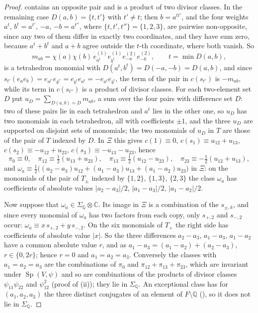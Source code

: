 \documentclass[11pt,reqno]{amsart}
\theoremstyle{plain}
\theoremstyle{definition}
\theoremstyle{remark}
\newcommand{\QQ}{\mathbb{Q}}
\newcommand{\CC}{\mathbb{C}}
\DeclareMathOperator{\Sp}{Sp}
\begin{document}
\begin{proof}
contains an opposite pair and is a product of two divisor classes. In the
remaining case $D(a,b)=\{t,t'\}$ with $t'\ne t$; then $b=a^{tt'}$, and the
four weights $a^{t}$, $b^{t}=a^{t'}$, $-a$, $-b=a^{t''}$, where
$\{t,t',t''\}=\{1,2,3\}$, are pairwise non-opposite, since any two of them
differ in exactly two coordinates, and they have sum zero, because
$a^{t}+b^{t}$ and $a+b$ agree outside the $t$-th coordinate, where both
vanish. So
\[
  m_{ab}=\chi(a)\chi(b)\,e^{(1)}_{a^{t}}e^{(1)}_{b^{t}}e^{(2)}_{-a}e^{(2)}_{-b},
  \qquad t=\min D(a,b),
\]
is a tetrahedron monomial with $D(a^{t},b^{t})=D(-a,-b)=D(a,b)$, and since
$s_{t'}(e_{a}e_{b})=e_{a^{t'}}e_{b^{t'}}=e_{b^{t}}e_{a^{t}}=-e_{a^{t}}e_{b^{t}}$,
the term of the pair in $c(s_{t'})$ is $-m_{ab}$, while its term in
$c(s_{t''})$ is a product of divisor classes. For each two-element set $D$
put $u_{D}=\sum_{D(a,b)=D}m_{ab}$, a sum over the four pairs with difference
set $D$: two of these pairs lie in each tetrahedron and $a^{t}$ lies in the
other one, so $u_{D}$ has two monomials in each tetrahedron, all with
coefficients $\pm1$, and the three $u_{D}$ are supported on disjoint sets of
monomials; the two monomials of $u_{D}$ in $T$ are those of the pair of
$T$ indexed by $D$. In $\Xi$ this gives $c(1)\equiv0$,
$c(s_{1})\equiv u_{12}+u_{13}$, $c(s_{2})\equiv-u_{12}+u_{23}$,
$c(s_{3})\equiv-u_{13}-u_{23}$, hence
\begin{equation}\label{eq:pimodulo}
  \pi_{0}\equiv0,\quad
  \pi_{12}\equiv\tfrac12(u_{13}+u_{23}),\quad
  \pi_{13}\equiv\tfrac12(u_{12}-u_{23}),\quad
  \pi_{23}\equiv-\tfrac12(u_{12}+u_{13}),
\end{equation}
and $\omega_{a}\equiv\frac12\bigl((a_{2}-a_{3})u_{12}+(a_{1}-a_{3})u_{13}
+(a_{1}-a_{2})u_{23}\bigr)$ in $\Xi$: on the monomials of the pair of
$T_{\pm}$ indexed by $\{1,2\}$, $\{1,3\}$, $\{2,3\}$ the class $\omega_{a}$
has coefficients of absolute values $|a_{2}-a_{3}|/2$, $|a_{1}-a_{3}|/2$,
$|a_{1}-a_{2}|/2$.

Now suppose that $\omega_{a}\in\Sigma_{\QQ}\otimes\CC$. Its image in $\Xi$
is a combination of the $s_{\pm,k}$, and since every monomial of
$\omega_{a}$ has two factors from each copy, only $s_{+,2}$ and $s_{-,2}$
occur: $\omega_{a}\equiv x\,s_{+,2}+y\,s_{-,2}$. On the six monomials of
$T_{+}$ the right side has coefficients of absolute value $|x|$. So the
three differences $a_{2}-a_{3}$, $a_{1}-a_{3}$, $a_{1}-a_{2}$ have a common
absolute value $r$, and as $a_{1}-a_{3}=(a_{1}-a_{2})+(a_{2}-a_{3})$,
$r\in\{0,2r\}$; hence $r=0$ and $a_{1}=a_{2}=a_{3}$. Conversely the classes
with $a_{1}=a_{2}=a_{3}$ are the combinations of $\pi_{0}$ and
$\pi_{12}+\pi_{13}+\pi_{23}$, which are invariant under $\Sp(V,\psi)$ and so
are combinations of the products of divisor classes $\psi_{11}\psi_{22}$ and
$\psi_{12}^{2}$ (proof of (ii)); they lie in
$\Sigma_{\QQ}$. An exceptional class
has for $(a_{1},a_{2},a_{3})$ the three distinct conjugates of an element of
$F\setminus\QQ$ (), so it does not lie in
$\Sigma_{\QQ}$.


\end{proof}
\end{document}
